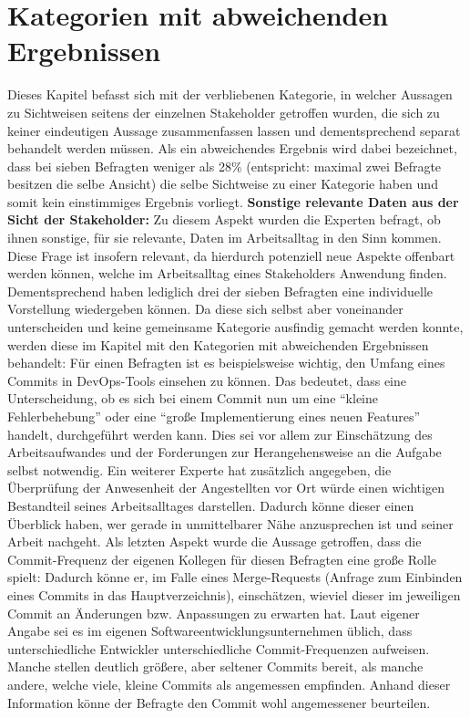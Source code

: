 \section{Kategorien mit abweichenden Ergebnissen} \label{noclearresult}
Dieses Kapitel befasst sich mit der verbliebenen Kategorie, in welcher Aussagen zu Sichtweisen seitens der einzelnen Stakeholder getroffen wurden, die sich zu keiner eindeutigen Aussage zusammenfassen lassen und dementsprechend separat 
behandelt werden müssen. Als ein abweichendes Ergebnis wird dabei bezeichnet, dass bei sieben Befragten weniger als 28\% (entspricht: maximal zwei Befragte besitzen die selbe Ansicht) die selbe Sichtweise zu einer Kategorie haben und somit kein einstimmiges Ergebnis vorliegt. \newline \newline
\textbf{Sonstige relevante Daten aus der Sicht der Stakeholder:} \newline
Zu diesem Aspekt wurden die Experten befragt, ob ihnen sonstige, für sie relevante, Daten im Arbeitsalltag in den Sinn kommen. Diese Frage ist insofern relevant, da hierdurch potenziell neue Aspekte offenbart werden können, welche im Arbeitsalltag eines Stakeholders Anwendung finden. Dementsprechend
haben lediglich drei der sieben Befragten eine individuelle Vorstellung wiedergeben können. \newline Da diese sich selbst aber voneinander unterscheiden und keine gemeinsame Kategorie ausfindig gemacht werden konnte, werden diese im Kapitel mit den Kategorien mit abweichenden Ergebnissen behandelt: Für einen Befragten ist es beispielsweise wichtig, den Umfang eines Commits in DevOps-Tools einsehen zu können. Das bedeutet, dass eine Unterscheidung, ob es sich bei einem Commit nun um eine \enquote{kleine Fehlerbehebung}
oder eine \enquote{große Implementierung eines neuen Features} handelt, durchgeführt werden kann. Dies sei vor allem zur Einschätzung des Arbeitsaufwandes und der Forderungen zur Herangehensweise an die Aufgabe selbst notwendig. \newline \newline 
Ein weiterer Experte hat zusätzlich angegeben, die Überprüfung der Anwesenheit der Angestellten vor Ort würde einen wichtigen Bestandteil seines Arbeitsalltages darstellen. Dadurch könne dieser einen Überblick haben, wer gerade in unmittelbarer Nähe anzusprechen ist und seiner Arbeit nachgeht. \newline Als letzten Aspekt wurde die Aussage getroffen, dass die Commit-Frequenz der eigenen Kollegen für diesen Befragten eine große Rolle spielt: Dadurch könne er, im Falle eines Merge-Requests (Anfrage zum Einbinden eines Commits in das Hauptverzeichnis), einschätzen, wieviel dieser im jeweiligen Commit an Änderungen bzw. Anpassungen zu erwarten hat.
Laut eigener Angabe sei es im eigenen Softwareentwicklungsunternehmen üblich, dass unterschiedliche Entwickler unterschiedliche Commit-Frequenzen aufweisen. Manche stellen deutlich größere, aber seltener Commits bereit, als manche andere, welche viele, kleine Commits als angemessen empfinden. Anhand dieser Information könne der Befragte den Commit wohl angemessener beurteilen.

